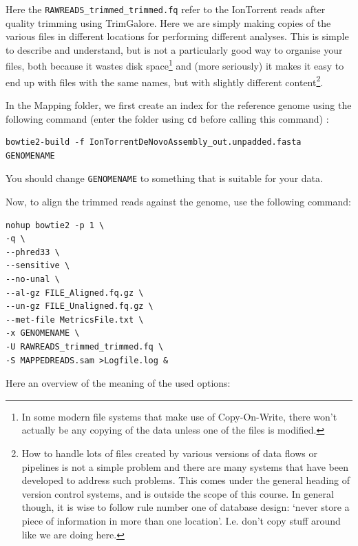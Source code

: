 \documentclass[11pt]{article}
\begin{document}
Here the \texttt{RAWREADS\_trimmed\_trimmed.fq} refer to the IonTorrent reads after
quality trimming using TrimGalore. Here we are simply making copies of the
various files in different locations for performing different analyses. This is simple to describe and
understand, but is not a particularly good way to organise your files, both
because it wastes disk space\footnote{In some modern file systems that make use of Copy-On-Write, there
won't actually be any copying of the data unless one of the files is modified.
 } and (more seriously) it makes it
easy to end up with files with the same names, but with slightly different
content\footnote{How to handle lots of files created by various versions of data
flows or pipelines is not a simple problem and there are many systems that
have been developed to address such problems. This comes under the general
heading of version control systems, and is outside the scope of this
course. In general though, it is wise to follow rule number one of database design:
`never store a piece of information in more than one location'. I.e. don't
copy stuff around like we are doing here.
 }.

In the Mapping folder, we first create an index for the reference genome using the
following command (enter the folder using \texttt{cd} before calling this command) :


\begin{verbatim}
bowtie2-build -f IonTorrentDeNovoAssembly_out.unpadded.fasta GENOMENAME
\end{verbatim}

You should change \texttt{GENOMENAME} to something that is suitable for your data.

Now, to align the trimmed reads against the genome, use the following command:


\begin{verbatim}
nohup bowtie2 -p 1 \
-q \
--phred33 \
--sensitive \
--no-unal \
--al-gz FILE_Aligned.fq.gz \
--un-gz FILE_Unaligned.fq.gz \
--met-file MetricsFile.txt \
-x GENOMENAME \
-U RAWREADS_trimmed_trimmed.fq \
-S MAPPEDREADS.sam >Logfile.log &
\end{verbatim}

Here an overview of the meaning of the used options:
\end{document}
